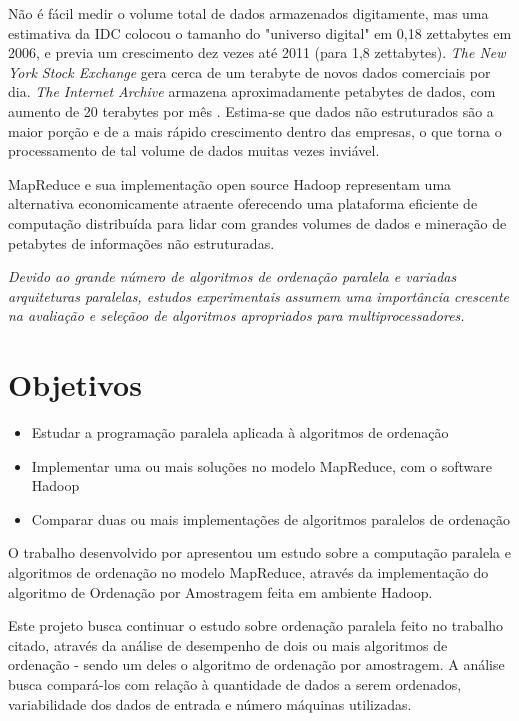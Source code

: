 Não é fácil medir o volume total de dados armazenados digitamente, mas uma estimativa da IDC colocou o tamanho do "universo digital" em 0,18 zettabytes em 2006, e previa um crescimento dez vezes até 2011 (para 1,8 zettabytes).
 \textit{The New York Stock Exchange} gera cerca de um terabyte de novos dados comerciais por dia. \textit{The Internet Archive} armazena aproximadamente petabytes de dados, com aumento de 20 terabytes por mês
\cite{Hadoop:2010}. Estima-se que dados não estruturados são a maior porção e de a mais rápido crescimento dentro das empresas, o que torna o processamento de tal volume de dados muitas vezes inviável.

MapReduce e sua implementação open source Hadoop representam uma alternativa economicamente atraente oferecendo uma plataforma eficiente de computação distribuída para lidar com grandes volumes de dados e mineração de petabytes de informações não estruturadas. \cite{Cherkasova:2011}


\textit{Devido ao grande número de algoritmos de ordenação paralela e variadas arquiteturas paralelas, estudos experimentais assumem uma importância crescente na avaliação e seleçãoo de algoritmos apropriados para multiprocessadores.}




\section{Objetivos}

\begin{itemize}
\item Estudar a programação paralela aplicada à algoritmos de ordenação
\item Implementar uma ou mais soluções no modelo MapReduce, com o software Hadoop
\item Comparar duas ou mais implementações de algoritmos paralelos de ordenação 
\end{itemize}

O trabalho desenvolvido por \cite{Paula:2011} apresentou um estudo sobre a computação paralela e algoritmos de ordenação no modelo MapReduce, através da implementação do algoritmo de Ordenação por Amostragem feita em ambiente Hadoop. 

Este projeto busca continuar o estudo sobre ordenação paralela feito no trabalho citado, através da análise de desempenho de dois ou mais algoritmos de ordenação - sendo um deles o algoritmo de ordenação por amostragem. A análise busca compará-los com relação à quantidade de dados a serem ordenados, variabilidade dos dados de entrada e número máquinas utilizadas. 

